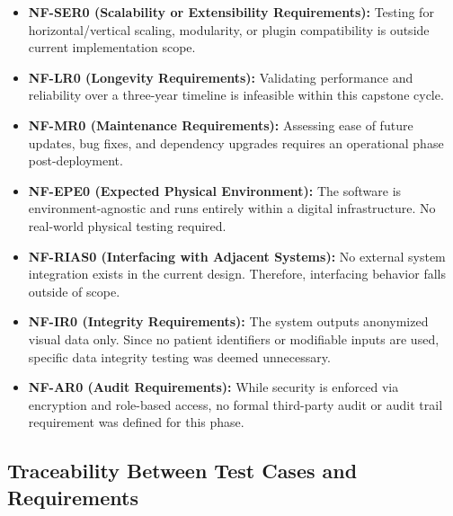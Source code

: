 \documentclass[12pt, titlepage]{article}
\begin{document}
\begin{itemize}
  \item \textbf{NF-SER0 (Scalability or Extensibility Requirements):} 
  Testing for horizontal/vertical scaling, modularity, or plugin compatibility is outside current implementation scope.
  
  \item \textbf{NF-LR0 (Longevity Requirements):} 
  Validating performance and reliability over a three-year timeline is infeasible within this capstone cycle.
  
  \item \textbf{NF-MR0 (Maintenance Requirements):} 
  Assessing ease of future updates, bug fixes, and dependency upgrades requires an operational phase post-deployment.
  
  \item \textbf{NF-EPE0 (Expected Physical Environment):} 
  The software is environment-agnostic and runs entirely within a digital infrastructure. No real-world physical testing required.
  
  \item \textbf{NF-RIAS0 (Interfacing with Adjacent Systems):} 
  No external system integration exists in the current design. Therefore, interfacing behavior falls outside of scope.
  
  \item \textbf{NF-IR0 (Integrity Requirements):} 
  The system outputs anonymized visual data only. Since no patient identifiers or modifiable inputs are used, specific data integrity testing was deemed unnecessary.
  
  \item \textbf{NF-AR0 (Audit Requirements):} 
  While security is enforced via encryption and role-based access, no formal third-party audit or audit trail requirement was defined for this phase.
\end{itemize}
\subsection{Traceability Between Test Cases and Requirements}

\end{document}
